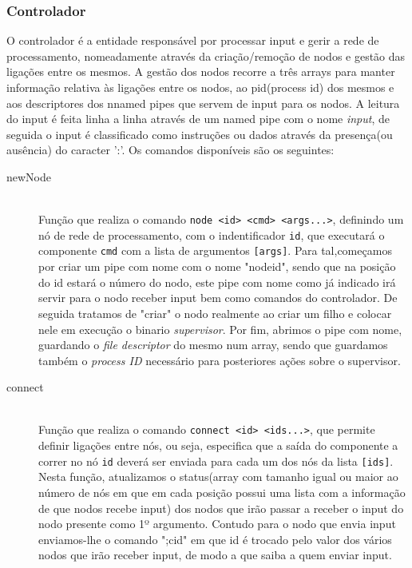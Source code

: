 \documentclass[12pt]{article}
\begin{document}
\subsubsection{Controlador}
O controlador é a entidade responsável por processar input e gerir a rede de processamento, nomeadamente através da criação/remoção de nodos e gestão das ligações entre os mesmos.
A gestão dos nodos recorre a três arrays para manter informação relativa às ligações entre os nodos, ao pid(process id) dos mesmos e aos descriptores dos nnamed pipes que servem de input para os nodos.
A leitura do input é feita linha a linha através de um named pipe com o nome \textit{input}, de seguida o input é classificado como instruções ou dados através da presença(ou ausência) do caracter ':'.
Os comandos disponíveis são os seguintes:

\begin{description} 
\item[newNode] \hfill \\
   Função que realiza o comando \texttt{node <id> <cmd> <args...>}, definindo um nó de rede de processamento, com o indentificador  \texttt{id}, que executará o componente \texttt{cmd} com a lista de argumentos \texttt{[args]}. Para tal,começamos por criar um pipe com nome com o nome "nodeid", sendo que na posição do id estará o número do nodo, este pipe com nome como já indicado irá servir para o nodo receber input bem como comandos do controlador. De seguida tratamos de "criar" o nodo realmente ao criar um filho e colocar nele em execução o binario \textit{supervisor}. Por fim, abrimos o pipe com nome, guardando o \textit{file descriptor} do mesmo num array, sendo que guardamos também o \textit{process ID} necessário para posteriores ações sobre o supervisor.

\item[connect] \hfill \\
    Função que realiza o comando \texttt{connect <id> <ids...>}, que permite definir ligações entre nós, ou seja, especifica que a saída do componente a correr no nó \texttt{id} deverá ser enviada para cada um dos nós da lista \texttt{[ids]}. Nesta função, atualizamos o status(array com tamanho igual ou maior ao número de nós em que em cada posição possui uma lista com a informação de que nodos recebe input) dos nodos que irão passar a receber o input do nodo presente como 1º argumento. Contudo para o nodo que envia input enviamos-lhe o comando ";cid" em que id é trocado pelo valor dos vários nodos que irão receber input, de modo a que saiba a quem enviar input.


\end{description}
\end{document}
